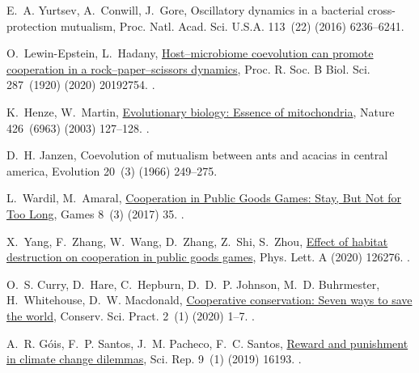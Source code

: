 \documentclass[5p]{elsarticle}
\begin{document}
\begin{thebibliography}{10}
E.~A. Yurtsev, A.~Conwill, J.~Gore, Oscillatory dynamics in a bacterial
  cross-protection mutualism, Proc. Natl. Acad. Sci. U.S.A. 113~(22) (2016) 6236--6241.

O.~Lewin-Epstein, L.~Hadany,
  \href{https://royalsocietypublishing.org/doi/10.1098/rspb.2019.2754}{{Host–microbiome
  coevolution can promote cooperation in a rock–paper–scissors dynamics}},
  Proc. R. Soc. B Biol. Sci. 287~(1920) (2020) 20192754.
\newblock \href {https://doi.org/10.1098/rspb.2019.2754}
  {}.

K.~Henze, W.~Martin,
  \href{http://www.nature.com/nature/journal/v426/n6963/full/426127a.html}{{Evolutionary
  biology: Essence of mitochondria}}, Nature 426~(6963) (2003) 127--128.
\newblock \href {https://doi.org/10.1038/426127a} {}.

D.~H. Janzen, Coevolution of mutualism between ants and acacias in central
  america, Evolution 20~(3) (1966) 249--275.

L.~Wardil, M.~Amaral, \href{http://www.mdpi.com/2073-4336/8/3/35}{{Cooperation
  in Public Goods Games: Stay, But Not for Too Long}}, Games 8~(3) (2017) 35.
\newblock \href {https://doi.org/10.3390/g8030035}
  {}.

X.~Yang, F.~Zhang, W.~Wang, D.~Zhang, Z.~Shi, S.~Zhou,
  \href{https://linkinghub.elsevier.com/retrieve/pii/S0375960120300694}{{Effect
  of habitat destruction on cooperation in public goods games}}, Phys. Lett. A
  (2020) 126276. \href {https://doi.org/10.1016/j.physleta.2020.126276}
  {}.

O.~S. Curry, D.~Hare, C.~Hepburn, D.~D.~P. Johnson, M.~D. Buhrmester,
  H.~Whitehouse, D.~W. Macdonald,
  \href{https://onlinelibrary.wiley.com/doi/abs/10.1111/csp2.123}{{Cooperative
  conservation: Seven ways to save the world}}, Conserv. Sci. Pract. 2~(1)
  (2020) 1--7.
\newblock \href {https://doi.org/10.1111/csp2.123}
  {}.

A.~R. G{\'{o}}is, F.~P. Santos, J.~M. Pacheco, F.~C. Santos,
  \href{http://www.nature.com/articles/s41598-019-52524-8}{{Reward and
  punishment in climate change dilemmas}}, Sci. Rep. 9~(1) (2019) 16193.
\newblock \href {https://doi.org/10.1038/s41598-019-52524-8}
  {}.


\end{thebibliography}
\end{document}
